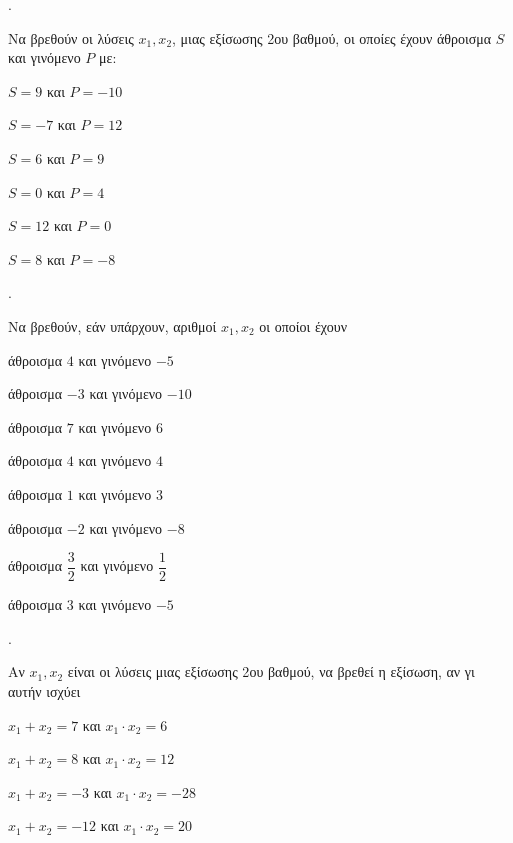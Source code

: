 \documentclass[11pt,a4paper,twocolumn]{article}
\newcounter{askhsh}
\newcommand{\askhsh}{{\large\theaskhsh.}\ \addtocounter{askhsh}{1}}
\begin{document}
\askhsh
Να βρεθούν οι λύσεις $ x_1, x_2 $, μιας εξίσωσης 2{ου} βαθμού, οι οποίες έχουν άθροισμα $ S $ και γινόμενο $ P $ με:
\begin{multicols}{2}
\begin{alist}[leftmargin=5mm]
\item $ S=9 $ και $ P=-10 $
\item $ S=-7 $ και $ P=12 $
\item $ S=6 $ και $ P=9 $
\item $ S=0 $ και $ P=4 $
\item $ S=12 $ και $ P=0 $
\item $ S=8 $ και $ P=-8 $
\end{alist}
\end{multicols}
\askhsh Να βρεθούν, εάν υπάρχουν, αριθμοί $x_1,x_2$ οι οποίοι έχουν
\begin{alist}
\item άθροισμα $4$ και γινόμενο $-5$
\item άθροισμα $-3$ και γινόμενο $-10$
\item άθροισμα $7$ και γινόμενο $6$
\item άθροισμα $4$ και γινόμενο $4$
\item άθροισμα $1$ και γινόμενο $3$
\item άθροισμα $-2$ και γινόμενο $-8$
\item άθροισμα $\dfrac{3}{2}$ και γινόμενο $\dfrac{1}{2}$
\item άθροισμα $3$ και γινόμενο $-5$
\end{alist}
\askhsh 
Αν $ x_1, x_2 $ είναι οι λύσεις μιας εξίσωσης 2{ου} βαθμού, να βρεθεί η εξίσωση, αν γι αυτήν ισχύει
\begin{alist}
\item $ x_1+x_2=7 $ και $ x_1\cdot x_2=6 $
\item $ x_1+x_2=8 $ και $ x_1\cdot x_2=12 $
\item $ x_1+x_2=-3 $ και $ x_1\cdot x_2=-28 $
\item $ x_1+x_2=-12 $ και $ x_1\cdot x_2=20 $
\end{alist}
\end{document}
